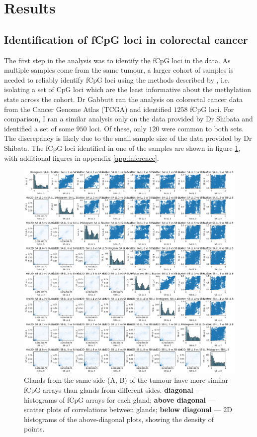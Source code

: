 \section{Results}
\subsection{Identification of fCpG loci in colorectal cancer}
The first step in the analysis was to identify the fCpG loci in the data. As
multiple samples come from the same tumour, a larger cohort of samples is
needed to reliably identify fCpG loci using the methods described by
\cite{gabbutt_evolutionary_2023}, i.e. isolating a set of CpG loci which are
the least informative about the methylation state across the cohort. Dr Gabbutt
ran the analysis on colorectal cancer data from the Cancer Genome Atlas (TCGA)
and identified $1258$ fCpG loci. For comparison, I ran a similar analysis only
on the data provided by Dr Shibata and identified a set of some $950$ loci. Of
these, only $120$ were common to both sets. The discrepancy is likely due to
the small sample size of the data provided by Dr Shibata. The fCpG loci
identified in one of the samples are shown in figure \ref{fig:fCpG_loci_S},
with additional figures in appendix \ref{app:inference}.

\begin{figure}[h]
    \centering
    \includegraphics[width=\textwidth]{Chapter_5/figures/fCpG_loci_S.png}
    \caption{Glands from the same side (A, B) of the tumour have more similar
    fCpG arrays than glands from different sides. \textbf{diagonal} ---
    histograms of fCpG arrays for each gland; \textbf{above diagonal} ---
    scatter plots of correlations between glands; \textbf{below diagonal} ---
    $2$D histograms of the above-diagonal plots, showing the density of points.}
    \label{fig:fCpG_loci_S}
\end{figure}


